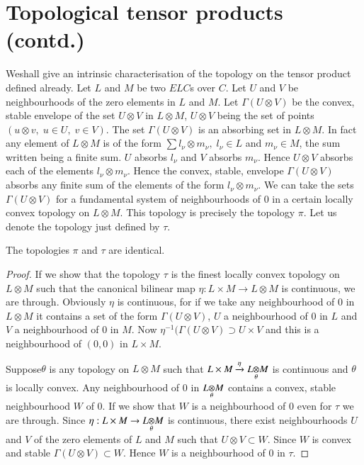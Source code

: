 
\chapter{Topological tensor products (contd.)}\label{chap13}

We\pageoriginale shall give an intrinsic characterisation of the topology on the
tensor product defined already. Let $L$ and $M$ be two $E L C$s over
$C$. Let $U$ and $V$ be neighbourhoods of the zero elements in $L$ and
$M$. Let $\Gamma(U\otimes V)$ be the convex, stable envelope of the
set $U\otimes V$ in $L\otimes M$, $U\otimes V$ being the set of points
$(u\otimes v,\; u \in U,\; v \in V)$. The set $\Gamma (U \otimes V)$
is an absorbing set in $L\otimes M$. In fact any element of $L\otimes
M$ is of the form $\sum l_\nu \otimes m_\nu, \; l_\nu \in L$ and
$m_\nu \in M$, the sum written being a finite sum. $U$ absorbs $l_\nu$
and $V$ absorbs $m_\nu$. Hence $U\otimes V$ absorbs each of the
elements $l_\nu \otimes m_\nu$. Hence the convex, stable, envelope
$\Gamma(U\otimes V)$ absorbs any finite sum of the elements of the
form $l_\nu \otimes m_\nu$. We can take the sets $\Gamma(U\otimes V)$
for a fundamental system of neighbourhoods of $0$ in a certain locally
convex topology on $L\otimes M$. This topology is precisely the
topology $\pi$. Let us denote the topology just defined by $\tau$.

\setcounter{section}{13}
\setcounter{prop}{0}
\begin{prop}\label{chap13:prop13.1}
The topologies $\pi$ and $\tau$ are identical.
\end{prop}

\begin{proof}
If we show that the topology $\tau$ is the finest locally convex
topology on $L\otimes M$ such that the canonical bilinear map $\eta :
L \times M \to L \otimes M$ is continuous, we are through. Obviously
$\eta$ is continuous, for if we take any neighbourhood of $0$ in
$L\otimes M$ it contains a set of the form $\Gamma(U\otimes V)$, $U$ a
neighbourhood of $0$ in $L$ and $V$ a neighbourhood of $0$ in $M$. Now
$\eta^{-1}(\Gamma(U\otimes V) \supset U \times V$ and this is a
neighbourhood of $(0, 0)$ in $L \times M$. 

Suppose\pageoriginale $\theta$ is any topology on $L \otimes M$ such
that $L \times M \xrightarrow{\eta} \foprod{L}{M}{\theta}$ is
continuous and $\theta$ is locally convex. Any neighbourhood of $0$ in
$\foprod{L}{M}{\theta}$ contains a convex, stable neighbourhood
$W$ of $0$. If we show that $W$ is a neighbourhood of $0$ even for
$\tau$ we are through. Since $\eta : L \times M \to
\foprod{L}{M}{\theta}$ is continuous, there exist neighbourhoods 
$U$ and $V$ of the zero elements of $L$ and $M$ such that $U\otimes V
\subset W$. Since $W$ is convex and stable $\Gamma(U\otimes V)\subset
W$. Hence $W$ is a neighbourhood of $0$ in $\tau$. 
\end{proof}

